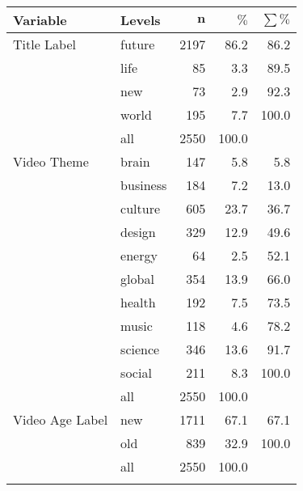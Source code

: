 \begingroup\footnotesize
\begin{longtable}{ll|rrr}
 \textbf{Variable} & \textbf{Levels} & $\mathbf{n}$ & $\mathbf{\%}$ & $\mathbf{\sum \%}$ \\ 
  \hline
Title Label & future & 2197 & 86.2 & 86.2 \\ 
   & life & 85 & 3.3 & 89.5 \\ 
   & new & 73 & 2.9 & 92.3 \\ 
   & world & 195 & 7.7 & 100.0 \\ 
   \hline
 & all & 2550 & 100.0 &  \\ 
   \hline
\hline
Video Theme & brain & 147 & 5.8 & 5.8 \\ 
   & business & 184 & 7.2 & 13.0 \\ 
   & culture & 605 & 23.7 & 36.7 \\ 
   & design & 329 & 12.9 & 49.6 \\ 
   & energy & 64 & 2.5 & 52.1 \\ 
   & global & 354 & 13.9 & 66.0 \\ 
   & health & 192 & 7.5 & 73.5 \\ 
   & music & 118 & 4.6 & 78.2 \\ 
   & science & 346 & 13.6 & 91.7 \\ 
   & social & 211 & 8.3 & 100.0 \\ 
   \hline
 & all & 2550 & 100.0 &  \\ 
   \hline
\hline
Video Age Label & new & 1711 & 67.1 & 67.1 \\ 
   & old & 839 & 32.9 & 100.0 \\ 
   \hline
 & all & 2550 & 100.0 &  \\ 
   \hline
\hline
\hline
\caption{} 
\label{cat}
\end{longtable}
\endgroup
